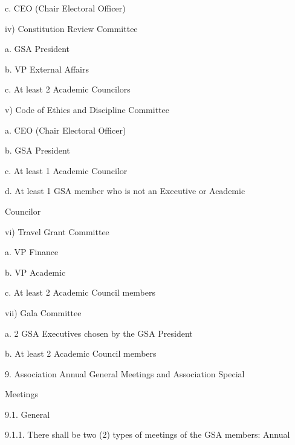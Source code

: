         c.  CEO (Chair Electoral Officer)  



iv)     Constitution Review Committee  



        a.  GSA President  



        b.  VP External Affairs  



        c.  At least 2 Academic Councilors  



v)      Code of Ethics and Discipline Committee  



        a.  CEO (Chair Electoral Officer)  



        b.  GSA President  



        c.  At least 1 Academic Councilor  



        d.  At  least  1  GSA  member  who  is  not  an  Executive  or  Academic  

            Councilor  



vi)     Travel Grant Committee  



        a.  VP Finance  



        b.  VP Academic  



        c.  At least 2 Academic Council members  



vii)    Gala Committee  



        a.  2 GSA Executives chosen by the GSA President  



        b.  At least 2 Academic Council members  



9.  Association   Annual   General   Meetings   and      Association   Special  

    Meetings  



9.1.        General  



9.1.1. There shall be two (2) types of meetings of the GSA members: Annual  

